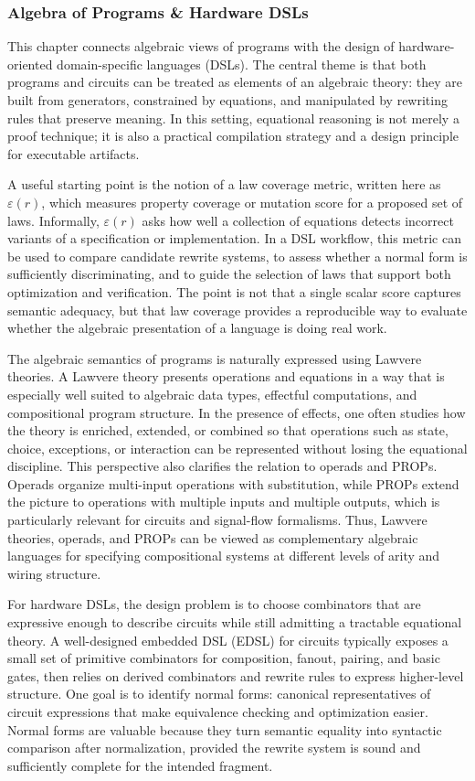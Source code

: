 \documentclass[11pt]{article}
\begin{document}
\subsubsection{Algebra of Programs \& Hardware DSLs}

This chapter connects algebraic views of programs with the design of hardware-oriented domain-specific languages (DSLs). The central theme is that both programs and circuits can be treated as elements of an algebraic theory: they are built from generators, constrained by equations, and manipulated by rewriting rules that preserve meaning. In this setting, equational reasoning is not merely a proof technique; it is also a practical compilation strategy and a design principle for executable artifacts.

A useful starting point is the notion of a law coverage metric, written here as \(\varepsilon(r)\), which measures property coverage or mutation score for a proposed set of laws. Informally, \(\varepsilon(r)\) asks how well a collection of equations detects incorrect variants of a specification or implementation. In a DSL workflow, this metric can be used to compare candidate rewrite systems, to assess whether a normal form is sufficiently discriminating, and to guide the selection of laws that support both optimization and verification. The point is not that a single scalar score captures semantic adequacy, but that law coverage provides a reproducible way to evaluate whether the algebraic presentation of a language is doing real work.

The algebraic semantics of programs is naturally expressed using Lawvere theories. A Lawvere theory presents operations and equations in a way that is especially well suited to algebraic data types, effectful computations, and compositional program structure. In the presence of effects, one often studies how the theory is enriched, extended, or combined so that operations such as state, choice, exceptions, or interaction can be represented without losing the equational discipline. This perspective also clarifies the relation to operads and PROPs. Operads organize multi-input operations with substitution, while PROPs extend the picture to operations with multiple inputs and multiple outputs, which is particularly relevant for circuits and signal-flow formalisms. Thus, Lawvere theories, operads, and PROPs can be viewed as complementary algebraic languages for specifying compositional systems at different levels of arity and wiring structure.

For hardware DSLs, the design problem is to choose combinators that are expressive enough to describe circuits while still admitting a tractable equational theory. A well-designed embedded DSL (EDSL) for circuits typically exposes a small set of primitive combinators for composition, fanout, pairing, and basic gates, then relies on derived combinators and rewrite rules to express higher-level structure. One goal is to identify normal forms: canonical representatives of circuit expressions that make equivalence checking and optimization easier. Normal forms are valuable because they turn semantic equality into syntactic comparison after normalization, provided the rewrite system is sound and sufficiently complete for the intended fragment.
\end{document}
